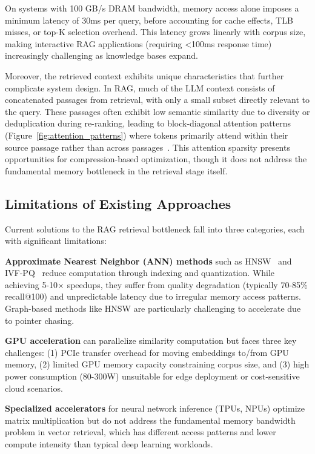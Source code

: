 \documentclass[conference]{IEEEtran}
\begin{document}
On systems with 100 GB/s DRAM bandwidth, memory access alone imposes a minimum latency of 30ms per query, before accounting for cache effects, TLB misses, or top-K selection overhead. This latency grows linearly with corpus size, making interactive RAG applications (requiring <100ms response time) increasingly challenging as knowledge bases expand.

Moreover, the retrieved context exhibits unique characteristics that further complicate system design. In RAG, much of the LLM context consists of concatenated passages from retrieval, with only a small subset directly relevant to the query. These passages often exhibit low semantic similarity due to diversity or deduplication during re-ranking, leading to block-diagonal attention patterns (Figure~\ref{fig:attention_patterns}) where tokens primarily attend within their source passage rather than across passages~\cite{refrag2025}. This attention sparsity presents opportunities for compression-based optimization, though it does not address the fundamental memory bottleneck in the retrieval stage itself.

\subsection{Limitations of Existing Approaches}

Current solutions to the RAG retrieval bottleneck fall into three categories, each with significant limitations:

\textbf{Approximate Nearest Neighbor (ANN) methods} such as HNSW~\cite{malkov2018hnsw} and IVF-PQ~\cite{johnson2019faiss} reduce computation through indexing and quantization. While achieving 5-10$\times$ speedups, they suffer from quality degradation (typically 70-85\% recall@100) and unpredictable latency due to irregular memory access patterns. Graph-based methods like HNSW are particularly challenging to accelerate due to pointer chasing.

\textbf{GPU acceleration} can parallelize similarity computation but faces three key challenges: (1) PCIe transfer overhead for moving embeddings to/from GPU memory, (2) limited GPU memory capacity constraining corpus size, and (3) high power consumption (80-300W) unsuitable for edge deployment or cost-sensitive cloud scenarios.

\textbf{Specialized accelerators} for neural network inference (TPUs, NPUs) optimize matrix multiplication but do not address the fundamental memory bandwidth problem in vector retrieval, which has different access patterns and lower compute intensity than typical deep learning workloads.
\end{document}

